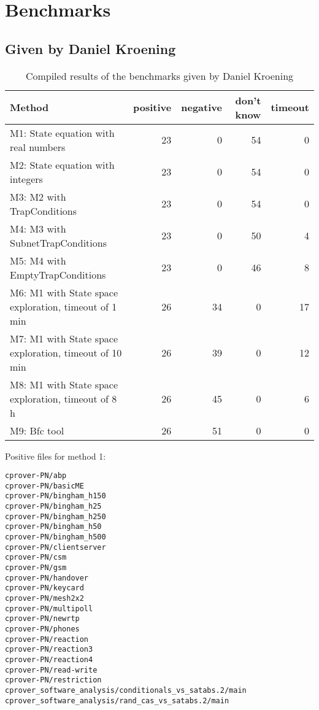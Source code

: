 \documentclass{article}
\begin{document}
\newpage

\section{Benchmarks}

\subsection{Given by Daniel Kroening}

\begin{table}[h]
\begin{center}
  \begin{tabular}{ | p{6cm} | r | r | r | r | }
    \hline
    Method & positive & negative & don't know & timeout \\
    \hline
    M1: State equation with real numbers & 23 &  0 & 54 &  0 \\
    M2: State equation with integers     & 23 &  0 & 54 &  0 \\
    \hline
    M3: M2 with TrapConditions               & 23 &  0 & 54 &  0 \\
    M4: M3 with SubnetTrapConditions         & 23 &  0 & 50 &  4 \\
    M5: M4 with EmptyTrapConditions          & 23 &  0 & 46 &  8 \\
    \hline
    M6: M1 with State space exploration, timeout of  1\,min & 26 & 34 & 0 & 17 \\
    M7: M1 with State space exploration, timeout of 10\,min & 26 & 39 & 0 & 12 \\
    M8: M1 with State space exploration, timeout of  8\,h   & 26 & 45 & 0 &  6 \\
    \hline
    M9: Bfc tool  & 26 & 51 & 0 &  0 \\
    \hline
  \end{tabular}
\end{center}
\caption{Compiled results of the benchmarks given by Daniel Kroening}
\label{table-results-compiled-dk}
\end{table}

Positive files for method 1:
\begin{lstlisting}
cprover-PN/abp
cprover-PN/basicME
cprover-PN/bingham_h150
cprover-PN/bingham_h25
cprover-PN/bingham_h250
cprover-PN/bingham_h50
cprover-PN/bingham_h500
cprover-PN/clientserver
cprover-PN/csm
cprover-PN/gsm
cprover-PN/handover
cprover-PN/keycard
cprover-PN/mesh2x2
cprover-PN/multipoll
cprover-PN/newrtp
cprover-PN/phones
cprover-PN/reaction
cprover-PN/reaction3
cprover-PN/reaction4
cprover-PN/read-write
cprover-PN/restriction
cprover_software_analysis/conditionals_vs_satabs.2/main
cprover_software_analysis/rand_cas_vs_satabs.2/main
\end{lstlisting}
\end{document}
